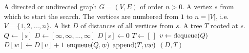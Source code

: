 
\begin{algorithmic}[1]
\Require A directed or undirected graph $G = (V, E)$ of order $n > 0$. A
  vertex $s$ from which to start the search. The vertices are numbered
  from $1$ to  $n = |V|$, i.e.~$V = \{1, 2, \dots, n\}$.
\Ensure A list $D$ of distances of all vertices from $s$. A tree $T$
  rooted at $s$.
\State $Q \gets [s]$\label{alg:BFS:initialize_queue_visit_nodes}
\State $D \gets [\infty, \infty, \dots, \infty]$
\State $D[s] \gets 0$
\State $T \gets [\,]$\label{alg:BFS:initialize_empty_tree}
  \State $v \gets \operatorname*{dequeue}(Q)$
      \State $D[w] \gets D[v] + 1$
      \State $\operatorname*{enqueue}(Q, w)$
      \State $\operatorname*{append}(T, vw)$\label{alg:BFS:while_loop:append_to_tree}
    \EndIf
  \EndFor
\EndWhile
\State \Return $(D, T)$
\end{algorithmic}
